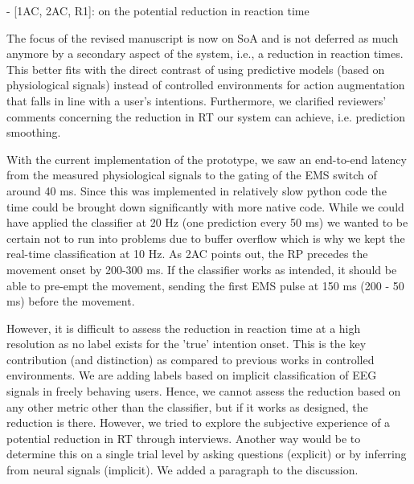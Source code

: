
- [1AC, 2AC, R1]: on the potential reduction in reaction time

The focus of the revised manuscript is now on SoA and is not deferred as much anymore by a secondary aspect of the system, i.e., a reduction in reaction times. This better fits with the direct contrast of using predictive models (based on physiological signals) instead of controlled environments for action augmentation that falls in line with a user's intentions. Furthermore, we clarified reviewers' comments concerning the reduction in RT our system can achieve, i.e. prediction smoothing.

With the current implementation of the prototype, we saw an end-to-end latency from the measured physiological signals to the gating of the EMS switch of around 40 ms. Since this was implemented in relatively slow python code the time could be brought down significantly with more native code. While we could have applied the classifier at 20 Hz (one prediction every 50 ms) we wanted to be certain not to run into problems due to buffer overflow which is why we kept the real-time classification at 10 Hz. As 2AC points out, the RP precedes the movement onset by 200-300 ms. If the classifier works as intended, it should be able to pre-empt the movement, sending the first EMS pulse at 150 ms (200 - 50 ms) before the movement. 

However, it is difficult to assess the reduction in reaction time at a high resolution as no label exists for the 'true' intention onset. This is the key contribution (and distinction) as compared to previous works in controlled environments. We are adding labels based on implicit classification of EEG signals in freely behaving users. Hence, we cannot assess the reduction based on any other metric other than the classifier, but if it works as designed, the reduction is there. However, we tried to explore the subjective experience of a potential reduction in RT through interviews. Another way would be to determine this on a single trial level by asking questions (explicit) or by inferring from neural signals (implicit). We added a paragraph to the discussion.


